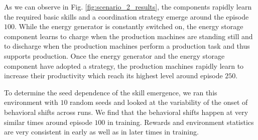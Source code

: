 As we can observe in Fig. \ref{fig:scenario_2_results}, the components rapidly learn the required basic skills and a coordination strategy emerge around the episode $100$. While the energy generator is constantly switched on, the energy storage component learns to charge when the production machines are standing still and to discharge when the production machines perform a production task and thus supports production. Once the energy generator and the energy storage component have adopted a strategy, the production machines rapidly learn to increase their productivity which reach its highest level around episode $250$.

To determine the seed dependence of the skill emergence, we ran this environment with $10$ random seeds and looked at the variability of the onset of behavioral shifts across runs. We find that the behavioral shifts happen at very similar times around episode $100$ in training. Rewards and environment statistics are very consistent in early as well as in later times in training.

